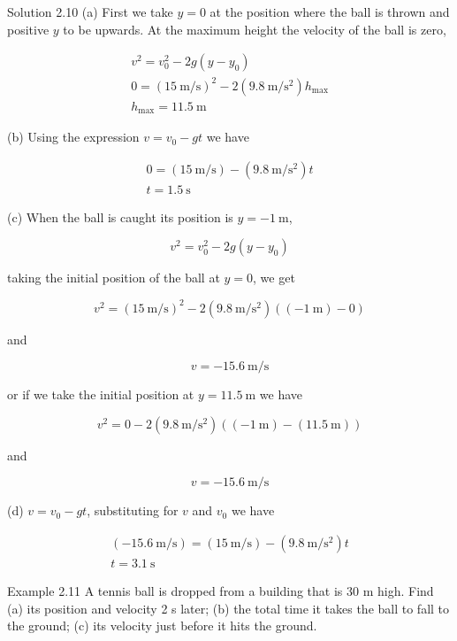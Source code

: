 \documentclass[10pt]{article}
\begin{document}
Solution 2.10 (a) First we take $y=0$ at the position where the ball is thrown and positive $y$ to be upwards. At the maximum height the velocity of the ball is zero,

$$
\begin{gathered}
v^{2}=v_{0}^{2}-2 g\left(y-y_{0}\right) \\
0=(15 \mathrm{~m} / \mathrm{s})^{2}-2\left(9.8 \mathrm{~m} / \mathrm{s}^{2}\right) h_{\max } \\
h_{\max }=11.5 \mathrm{~m}
\end{gathered}
$$

(b) Using the expression $v=v_{0}-g t$ we have

$$
\begin{gathered}
0=(15 \mathrm{~m} / \mathrm{s})-\left(9.8 \mathrm{~m} / \mathrm{s}^{2}\right) t \\
t=1.5 \mathrm{~s}
\end{gathered}
$$

(c) When the ball is caught its position is $y=-1 \mathrm{~m}$,

$$
v^{2}=v_{0}^{2}-2 g\left(y-y_{0}\right)
$$

taking the initial position of the ball at $y=0$, we get

$$
v^{2}=(15 \mathrm{~m} / \mathrm{s})^{2}-2\left(9.8 \mathrm{~m} / \mathrm{s}^{2}\right)((-1 \mathrm{~m})-0)
$$

and

$$
v=-15.6 \mathrm{~m} / \mathrm{s}
$$

or if we take the initial position at $y=11.5 \mathrm{~m}$ we have

$$
v^{2}=0-2\left(9.8 \mathrm{~m} / \mathrm{s}^{2}\right)((-1 \mathrm{~m})-(11.5 \mathrm{~m}))
$$

and

$$
v=-15.6 \mathrm{~m} / \mathrm{s}
$$

(d) $v=v_{0}-g t$, substituting for $v$ and $v_{0}$ we have

$$
\begin{gathered}
(-15.6 \mathrm{~m} / \mathrm{s})=(15 \mathrm{~m} / \mathrm{s})-\left(9.8 \mathrm{~m} / \mathrm{s}^{2}\right) t \\
t=3.1 \mathrm{~s}
\end{gathered}
$$

Example 2.11 A tennis ball is dropped from a building that is 30 m high. Find (a) its position and velocity 2 s later; (b) the total time it takes the ball to fall to the ground; (c) its velocity just before it hits the ground.
\end{document}
